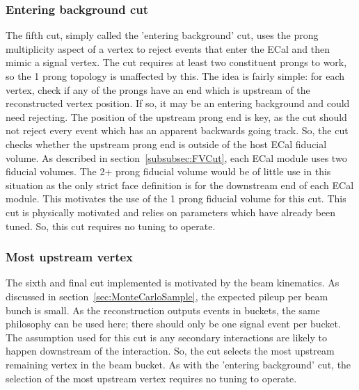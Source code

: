 \subsubsection{Entering background cut}
\label{subsubsec:EnteringBackgroundCut}
The fifth cut, simply called the 'entering background' cut, uses the prong multiplicity aspect of a vertex to reject events that enter the ECal and then mimic a signal vertex.  The cut requires at least two constituent prongs to work, so the 1 prong topology is unaffected by this.  The idea is fairly simple: for each vertex, check if any of the prongs have an end which is upstream of the reconstructed vertex position.  If so, it may be an entering background and could need rejecting.  The position of the upstream prong end is key, as the cut should not reject every event which has an apparent backwards going track.  So, the cut checks whether the upstream prong end is outside of the host ECal fiducial volume.  As described in section~\ref{subsubsec:FVCut}, each ECal module uses two fiducial volumes.  The 2+ prong fiducial volume would be of little use in this situation as the only strict face definition is for the downstream end of each ECal module.  This motivates the use of the 1 prong fiducial volume for this cut.  This cut is physically motivated and relies on parameters which have already been tuned.  So, this cut requires no tuning to operate.

\subsubsection{Most upstream vertex}
\label{subsubsec:MostUpstreamCut}
The sixth and final cut implemented is motivated by the beam kinematics.  As discussed in section~\ref{sec:MonteCarloSample}, the expected pileup per beam bunch is small.  As the reconstruction outputs events in buckets, the same philosophy can be used here; there should only be one signal event per bucket.  The assumption used for this cut is any secondary interactions are likely to happen downstream of the interaction.  So, the cut selects the most upstream remaining vertex in the beam bucket.  As with the 'entering background' cut, the selection of the most upstream vertex requires no tuning to operate.


